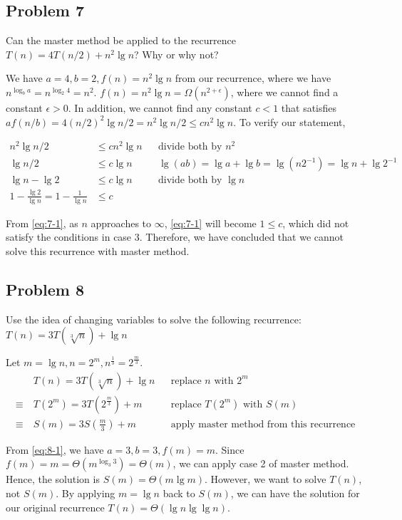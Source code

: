 \documentclass[a4paper]{article}
\makeatletter
\newenvironment{solution}
  {\begin{proof}[Solution]}
  {\end{proof}}
\renewenvironment{proof}[1][\proofname]{%
  \par\pushQED{\qed}\normalfont%
  \topsep6\p@\@plus6\p@\relax
  \trivlist\item[\hskip\labelsep\bfseries#1\@addpunct{.}]%
  \ignorespaces
}{%
  \popQED\endtrivlist\@endpefalse
}
\makeatother
\begin{document}
\subsection*{Problem 7}
Can the master method be applied to the recurrence $T(n)=4T(n/2)+n^2 \lg n$? Why or why not?
\begin{solution}
  We have $a = 4, b = 2, f(n) = n^2\lg n$ from our recurrence, where we have $n^{\log_{b}a} = n^{\log_{2}4} = n^2$. $f(n) = n^2\lg n= \Omega({n^{2 + \epsilon}})$, where we cannot find a constant $\epsilon > 0$. In addition, we cannot find any constant $c < 1$ that satisfies $af(n/b) = 4(n/2)^2\lg n/2  = n^2\lg n/2 \le cn^2 \lg n$. To verify our statement,

  \begin{align}
    n^2\lg n/2 &\le cn^2 \lg n && \text{divide both by $n^2$}\nonumber\\
    \lg n/2 &\le c\lg n && \lg(ab) = \lg a + \lg b = \lg(n2^{-1}) = \lg n + \lg2^{-1}\nonumber\\
    \lg n - \lg 2 &\le c\lg n && \text{divide both by $\lg n$}\nonumber\\
    1 - \frac{\lg 2}{\lg n} = 1 - \frac{1}{\lg n}&\le c \label{eq:7-1}
  \end{align}

  From \eqref{eq:7-1}, as $n$ approaches to $\infty$, \eqref{eq:7-1} will become $1 \le c$, which did not satisfy the conditions in case 3. Therefore, we have concluded that we cannot solve this recurrence with master method.
\end{solution}
\setcounter{equation}{0}

\subsection*{Problem 8}
Use the idea of changing variables to solve the following recurrence: $T(n)=3T(\sqrt[3]n)+\lg n$
\begin{solution}
  Let $m = \lg n, n = 2^m, n^{\frac{1}{3}} = 2^{\frac{m}{3}}$.
  \begin{align}
          & T(n) = 3T(\sqrt[3]{n}) + \lg n && \text{replace $n$ with $2^m$}\nonumber\\
    \equiv\ & T(2^m) = 3T(2^{\frac{m}{3}}) + m && \text{replace $T(2^m)$ with $S(m)$}\nonumber\\
    \equiv\ & S(m) = 3S(\frac{m}{3}) + m \label{eq:8-1} && \text{apply master method from this recurrence}
  \end{align}

  From \eqref{eq:8-1}, we have $a = 3, b = 3, f(m) = m$. Since $f(m) =m = \Theta(m^{\log_{3}{3}}) = \Theta(m)$, we can apply case 2 of master method. Hence, the solution is $S(m) = \Theta(m\lg m)$. However, we want to solve $T(n)$, not $S(m)$. By applying $m = \lg n$ back to $S(m)$, we can have the solution for our original recurrence $T(n) = \Theta(\lg n \lg \lg n)$.
\end{solution}
\end{document}
